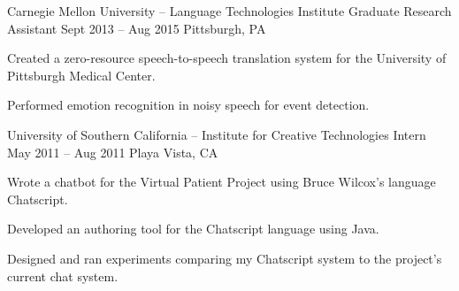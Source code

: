 \begin{cventries}
  \cventry
   {Carnegie Mellon University -- Language Technologies Institute} %
    {Graduate Research Assistant} %
    {Sept 2013 – Aug 2015} %
    {Pittsburgh, PA} %
    {
      \begin{cvitems} %
        \item {Created a zero-resource speech-to-speech translation system for the University of Pittsburgh Medical Center.}
        \item {Performed emotion recognition in noisy speech for event detection.}
      \end{cvitems}
    }
  \cventry
   {University of Southern California -- Institute for Creative Technologies} %
    {Intern} %
    {May 2011 – Aug 2011} %
    {Playa Vista, CA} %
    {
      \begin{cvitems} %
        \item {Wrote a chatbot for the Virtual Patient Project using Bruce Wilcox’s language Chatscript.}
        \item {Developed an authoring tool for the Chatscript language using Java.}
        \item {Designed and ran experiments comparing my Chatscript system to the project’s current chat system.}
      \end{cvitems}
    }

\end{cventries}
